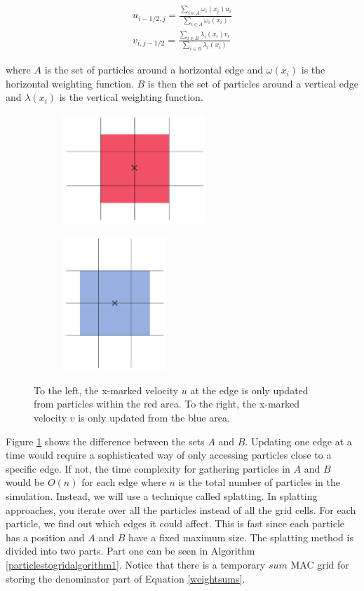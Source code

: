 \begin{eqnarray}
u_{i-1/2,j} = \frac{\sum\limits_{i\in A}\omega_i(x_i) u_{i}}{\sum\limits_{i \in A}\omega_i(x_i)} \\
v_{i,j-1/2} = \frac{ \sum\limits_{i \in B}\lambda_i(x_i) v_{i}}{\sum\limits_{i \in B}\lambda_i(x_i)}
\label{weightsums}
\end{eqnarray}

where $A$ is the set of particles around a horizontal edge and $\omega(x_i)$ is the horizontal weighting function. $B$ is then the set of particles around a vertical edge and $\lambda(x_i)$ is the vertical weighting function.
\begin{figure}[ht!]
\centering
\begin{subfigure}[b]{0.5\textwidth}
\includegraphics[height=41mm]{img/areau.pdf}
\end{subfigure}
\begin{subfigure}[b]{0.3\textwidth}
\includegraphics[height=51mm]{img/areav.pdf}
\end{subfigure}
\caption{To the left, the x-marked velocity $u$ at the edge is only updated from particles within the red area. To the right, the x-marked velocity $v$ is only updated from the blue area.}
\label{areaa}
\end{figure}
\newline
\newline
\noindent
Figure \ref{areaa} shows the difference between the sets $A$ and $B$. Updating one edge at a time would require a sophisticated way of only accessing particles close to a specific edge. If not, the time complexity for gathering particles in $A$ and $B$ would be $O(n)$ for each edge where $n$ is the total number of particles in the simulation. Instead, we will use a technique called splatting. In splatting approaches, you iterate over all the particles instead of all the grid cells. For each particle, we find out which edges it could affect. This is fast since each particle has a position and $A$ and $B$ have a fixed maximum size. The splatting method is divided into two parts. Part one can be seen in Algorithm \ref{particlestogridalgorithm1}. Notice that there is a temporary $sum$ MAC grid for storing the denominator part of Equation \ref{weightsums}.
